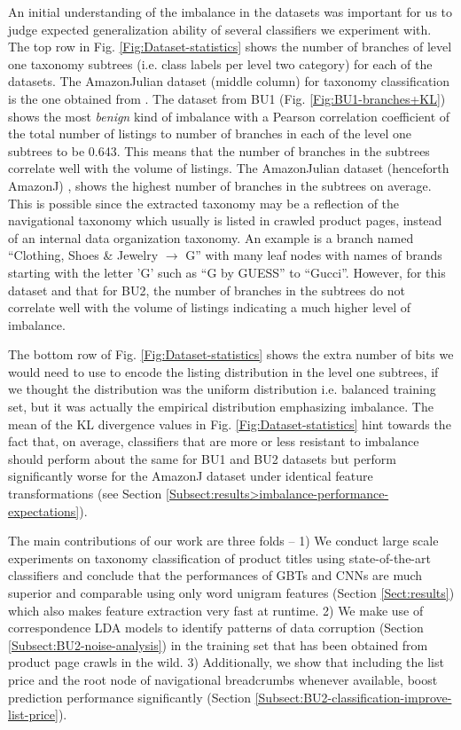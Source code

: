 An initial understanding of the imbalance in the datasets was important for us to judge expected generalization ability of several classifiers we experiment with. 
The top row in Fig. \ref{Fig:Dataset-statistics} shows the number of branches of level one taxonomy subtrees (i.e. class labels per level two category) for each of the datasets.
The AmazonJulian dataset (middle column) for taxonomy classification is the one obtained from \cite{Julian15}.
The dataset from BU1 (Fig. \ref{Fig:BU1-branches+KL}) shows the most \textit{benign} kind of imbalance with a Pearson correlation coefficient of the total number of listings to number of branches in each of the level one subtrees to be 0.643.
This means that the number of branches in the subtrees correlate well with the volume of listings.
The AmazonJulian dataset (henceforth AmazonJ) \cite{Julian15}, shows the highest number of branches in the subtrees on average.
This is possible since the extracted taxonomy may be a reflection of the navigational taxonomy which usually is listed in crawled product pages, instead of an internal data organization taxonomy.
An example is a branch named ``Clothing, Shoes \& Jewelry $\rightarrow$ G'' with many leaf nodes with names of brands starting with the letter 'G' such as ``G by GUESS'' to ``Gucci''.
However, for this dataset and that for BU2, the number of branches in the subtrees do not correlate well with the volume of listings indicating a much higher level of imbalance.

The bottom row of Fig. \ref{Fig:Dataset-statistics} shows the extra number of bits we would need to use to encode the listing distribution in the level one subtrees, if we thought the distribution was the uniform distribution i.e. balanced training set, but it was actually the empirical distribution emphasizing imbalance.
The mean of the KL divergence values in Fig. \ref{Fig:Dataset-statistics} hint towards the fact that, on average, classifiers that are more or less resistant to imbalance should perform about the same for BU1 and BU2 datasets but perform significantly worse for the AmazonJ dataset under identical feature transformations (see Section \ref{Subsect:results>imbalance-performance-expectations}).

The main contributions of our work are three folds -- 
1) We conduct large scale experiments on taxonomy classification of product titles using state-of-the-art classifiers and conclude that the performances of GBTs and CNNs are much superior and comparable using only word unigram features (Section \ref{Sect:results}) which also makes feature extraction very fast at runtime. 
2) We make use of correspondence LDA models to identify patterns of data corruption (Section \ref{Subsect:BU2-noise-analysis}) in the training set that has been obtained from product page crawls in the wild. 
3) Additionally, we show that including the list price and the root node of navigational breadcrumbs whenever available, boost prediction performance significantly (Section \ref{Subsect:BU2-classification-improve-list-price}).
